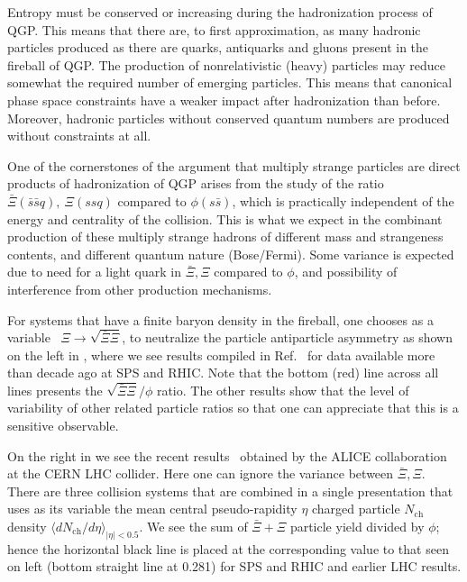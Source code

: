 Entropy must be conserved or increasing during the hadronization process of QGP. This means that there are, to first approximation, as many hadronic particles produced as there are quarks, antiquarks and gluons present in the fireball of QGP. The production of nonrelativistic (heavy) particles may reduce somewhat the required number of emerging particles. This means that canonical phase space constraints have a weaker impact after hadronization than before. Moreover, hadronic particles without conserved quantum numbers are produced without constraints at all.

One of the cornerstones of the argument that multiply strange particles are direct products of hadronization of QGP arises from the study of the ratio $\bar \Xi(\bar s\bar s q),\ \Xi(ssq)$ compared to $\phi(s\bar s)$, which is practically independent of the energy and centrality of the collision. This is what we expect in the combinant production of these multiply strange hadrons of different mass and strangeness contents, and different quantum nature (Bose/Fermi). Some variance is expected due to need for a light quark in $\bar \Xi, \Xi$ compared to $\phi$, and possibility of interference from other production mechanisms. 

For systems that have a finite baryon density in the fireball, one chooses as a variable~\cite{Petran:2009dc} $\Xi\to \sqrt{\bar \Xi \Xi}$, to neutralize the particle antiparticle asymmetry as shown on the left in , where we see results compiled in Ref.~\cite{Petran:2009dc} for data available more than decade ago at SPS and RHIC. Note that the bottom (red) line across all lines presents the $\sqrt{\bar \Xi \Xi}/\phi$ ratio. The other results show that the level of variability of other related particle ratios so that one can appreciate that this is a sensitive observable.

On the right in  we see the recent results~\cite{Tripathy:2018ehz,Tripathy:2019flj} obtained by the ALICE collaboration at the CERN LHC collider. Here one can ignore the variance between $\bar \Xi, \Xi$. There are three collision systems that are combined in a single presentation that uses as its variable the mean central pseudo-rapidity $\eta$ charged particle $N_\mathrm{ch}$ density $\langle dN_\mathrm{ch}/d\eta\rangle_{|\eta|<0.5}$. We see the sum of $\bar \Xi+ \Xi$ particle yield divided by $\phi$; hence the horizontal black line is placed at the corresponding value to that seen on left (bottom straight line at 0.281) for SPS and RHIC and earlier LHC results.

